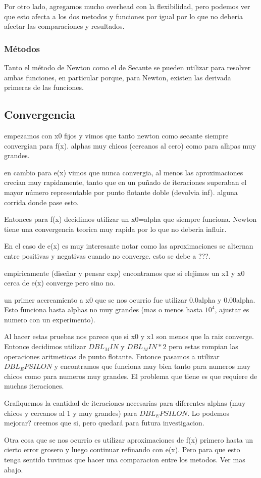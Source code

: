 Por otro lado, agregamos mucho overhead con la flexibilidad, pero podemos ver
que esto afecta a los dos metodos y funciones por igual por lo que no deberia
afectar las comparaciones y resultados.

\subsubsection{Métodos}
Tanto el método de Newton como el de Secante se pueden utilizar para resolver ambas funciones,
en particular porque, para Newton, existen las derivada primeras de las funciones.

\subsection{Convergencia}
empezamos con x0 fijos y vimos que tanto newton como secante siempre convergian
para f(x). %
alphas muy chicos (cercanos al cero) como para alhpas muy grandes.

en cambio para e(x) vimos que nunca convergia, al menos las aproximaciones
crecian muy rapidamente, tanto que en un puñado de iteraciones superaban el
mayor número representable por punto flotante doble (devolvia inf). %
alguna corrida donde pase esto.

Entonces para f(x) decidimos utilizar un x0=alpha que siempre funciona. Newton
tiene una convergencia teorica muy rapida por lo que no deberia influir.

En el caso de e(x) es muy interesante notar como las aproximaciones se alternan
entre positivas y negativas cuando no converge. esto se debe a ???.


empiricamente (diseñar y pensar exp) encontramos que si elejimos un x1 y x0
cerca de e(x) converge pero sino no.

un primer acercamiento a x0 que se nos ocurrio fue utilizar 0.0alpha y
0.00alpha. Esto funciona hasta alphas no muy grandes (mas o menos hasta $10^4$,
ajustar es numero con un experimento).

Al hacer estas pruebas nos parece que si x0 y x1 son menos que la raiz
converge. Entonce decidimos utilizar $DBL_MIN$ y $DBL_MIN * 2$ pero estas rompian
las operaciones aritmeticas de punto flotante. Entonce pasamos a utilizar
$DBL_EPSILON$ y encontramos que funciona muy bien tanto para numeros muy chicos
como para numeros muy grandes. El problema que tiene es que requiere de muchas
iteraciones.

Grafiquemos la cantidad de iteraciones necesarias para diferentes alphas (muy
chicos y cercanos al $1$ y muy grandes) para $DBL_EPSILON$. Lo podemos mejorar?
creemos que si, pero quedará para futura investigacion.

Otra cosa que se nos ocurrio es utilizar aproximaciones de f(x) primero hasta
un cierto error grosero y luego continuar refinando con e(x). Pero para que
esto tenga sentido tuvimos que hacer una comparacion entre los metodos. Ver mas
abajo.

